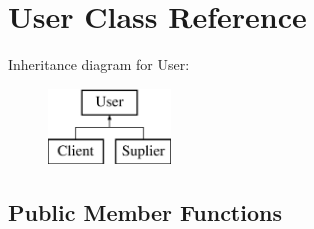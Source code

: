 \hypertarget{class_user}{}\section{User Class Reference}
\label{class_user}
Inheritance diagram for User\+:\begin{figure}[H]
\begin{center}
\leavevmode
\includegraphics[height=2.000000cm]{class_user}
\end{center}
\end{figure}
\subsection*{Public Member Functions}
